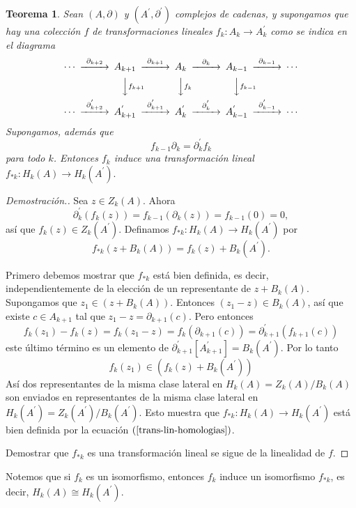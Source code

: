 \documentclass[12pt]{book}
\newtheorem{theorem}{Teorema}[section]
\theoremstyle{definition}
\newcounter{in}
\newcounter{ini}
\begin{document}
\begin{theorem}
  Sean $(A,\partial)$ y $(A^{'},\partial^{'})$ complejos de cadenas, y
  supongamos que hay una colección $f$ de transformaciones lineales
  $f_{k}:A_{k}\rightarrow A^{'}_{k}$ como se indica en el diagrama  
  \[
  \begin{CD}
    \cdots @>{\partial_{k+2}}>> A_{k+1} @>{\partial_{k+1}}>> A_{k} @>{\partial_{k}}>> A_{k-1} @>{\partial_{k-1}}>> \cdots\\
    @.   @VVf_{k+1}V   @VVf_{k}V   @VVf_{k-1}V    \\
    \cdots @>{\partial^{'}_{k+2}}>> A^{'}_{k+1} @>{\partial^{'}_{k+1}}>> A^{'}_{k} @>{\partial^{'}_{k}}>> A^{'}_{k-1} @>{\partial^{'}_{k-1}}>> \cdots
  \end{CD}
  \]
  Supongamos, además que
  $$f_{k-1}\partial_{k}=\partial^{'}_{k}f_{k}$$
  para todo $k$. Entonces $f_{k}$ induce una transformación lineal
  $f_{*k}:H_{k}(A)\rightarrow H_{k}(A^{'}).$
\end{theorem}
\begin{proof}[Demostración.]
  Sea $z\in Z_{k}(A)$. Ahora
  \begin{equation*}
    \partial^{'}_{k}(f_{k}(z))=f_{k-1}(\partial_{k}(z))=f_{k-1}(0)=0,
  \end{equation*}
  así que $f_{k}(z)\in Z_{k}(A^{'})$. Definamos
  $f_{*k}:H_{k}(A)\rightarrow H_{k}(A^{'})$ por
  \begin{equation}
    \label{trans-lin-homologias}
    f_{*k}(z+B_{k}(A))=f_{k}(z)+B_{k}(A^{'}).
  \end{equation}
  
  Primero debemos mostrar que $f_{*k}$ está bien definida, es decir,
  independientemente de la elección de un representante de
  $z+B_{k}(A).$ Supongamos que $z_{1}\in (z+B_{k}(A)).$ Entonces
  $(z_{1}-z)\in B_{k}(A)$, así que existe $c\in A_{k+1}$ tal que
  $z_{1}-z=\partial_{k+1}(c).$ Pero entonces
  $$f_{k}(z_{1})-f_{k}(z)=f_{k}(z_{1}-z)=f_{k}(\partial_{k+1}(c))=\partial^{'}_{k+1}(f_{k+1}(c))$$
  este último término es un elemento de
  $\partial^{'}_{k+1}[A^{'}_{k+1}]=B_{k}(A^{'}).$ Por lo tanto
  $$f_{k}(z_{1})\in (f_{k}(z)+B_{k}(A^{'}))$$
  Así dos representantes de la misma clase lateral en
  $H_{k}(A)=Z_{k}(A)/B_{k}(A)$ son enviados en representantes de la misma
  clase lateral en $H_{k}(A^{'})=Z_{k}(A^{'})/B_{k}(A^{'}).$ Esto muestra
  que $f_{*k}:H_{k}(A)\rightarrow H_{k}(A^{'})$ está bien definida por
  la ecuación $(\ref{trans-lin-homologias})$.
  
  Demostrar que $f_{*k}$ es una transformación lineal se sigue de la
  linealidad de $f$.
\end{proof}
Notemos que si $f_{k}$ es un isomorfismo, entonces $f_{k}$ induce un
isomorfismo $f_{*k}$, es decir, $H_{k}(A)\cong H_{k}(A^{'})$.
\end{document}
